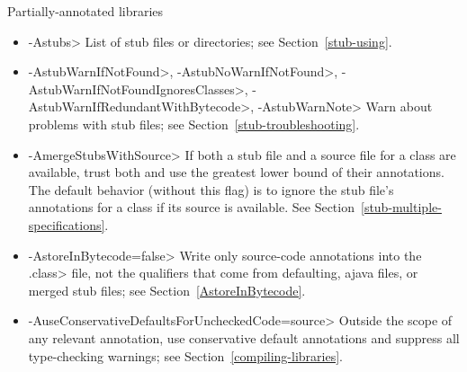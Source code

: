 \begin{itemize}
\end{itemize}

Partially-annotated libraries
\begin{itemize}


\item \<-Astubs>
  List of stub files or directories; see Section~\ref{stub-using}.

\item
  \<-AstubWarnIfNotFound>,
  \<-AstubNoWarnIfNotFound>,
  \<-AstubWarnIfNotFoundIgnoresClasses>,
  \<-AstubWarnIfRedundantWithBytecode>,
  \<-AstubWarnNote>
  Warn about problems with stub files; see Section~\ref{stub-troubleshooting}.

\item \<-AmergeStubsWithSource>
  If both a stub file and a source file for a class are available, trust
  both and use the greatest lower bound of their annotations. The default
  behavior (without this flag) is to ignore the stub file's annotations for
  a class if its source is available. See Section~\ref{stub-multiple-specifications}.

\item \<-AstoreInBytecode=false>
  Write only source-code annotations into the \<.class> file, not the
  qualifiers that come from defaulting, ajava files, or merged stub files;
  see Section~\ref{AstoreInBytecode}.

\item \<-AuseConservativeDefaultsForUncheckedCode=source>
  Outside the scope of any relevant
   annotation, use conservative
  default annotations and suppress all type-checking warnings; see
  Section~\ref{compiling-libraries}.

\end{itemize}

